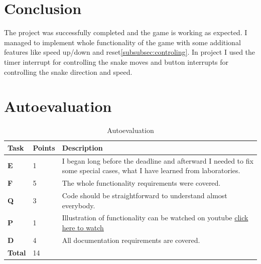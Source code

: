 \documentclass[a4paper, 11pt]{article}
\begin{document}


    \section{Conclusion}\label{sec:conclusion}
    The project was successfully completed and the game is working as expected.
    I managed to implement whole functionality of the game with some additional
    features like speed up/down and reset\ref{subsubsec:controling}.
    In project I used the timer interrupt for controlling the snake moves
    and button interrupts for controlling the snake direction and speed.




    \section{Autoevaluation}\label{sec:autoevaluation}
    \begin{table}[H]
        \centering
        \caption{Autoevaluation}\label{tab:table1}
        \label{tab:my_label}
        \begin{tabularx}{\textwidth}{XXX}
            \toprule
            \textbf{Task}  & \textbf{Points} & \textbf{Description}                                                                                                      \\
            \midrule
            \textbf{E}     & 1               & I began long before the deadline and afterward I needed to fix some special cases, what I have learned from laboratories. \\
            \hline
            \textbf{F}     & 5               & The whole functionality requirements were covered.                                                                        \\
            \hline
            \textbf{Q}     & 3               & Code should be straightforward to understand almost everybody.                                                            \\
            \hline
            \textbf{P}     & 1               & Illustration of functionality can be watched on youtube \href{https://youtu.be/V0ONHRM66mM}{click here to watch}          \\
            \hline
            \textbf{D}     & 4               & All documentation requirements are covered.                                                                               \\
            \hline
            \textbf{Total} & 14              &                                                                                                                           \\
            \bottomrule
        \end{tabularx}

    \end{table}


    \clearpage
    
    \renewcommand{\refname}{Literature}\label{sec:literatura}
    
\end{document}
